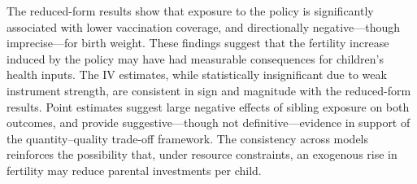 \documentclass[]{AEA}
\begin{document}
The reduced-form results show that exposure to the policy is
significantly associated with lower vaccination coverage, and
directionally negative---though imprecise---for birth weight. These
findings suggest that the fertility increase induced by the policy may
have had measurable consequences for children's health inputs. The IV
estimates, while statistically insignificant due to weak instrument
strength, are consistent in sign and magnitude with the reduced-form
results. Point estimates suggest large negative effects of sibling
exposure on both outcomes, and provide suggestive---though not
definitive---evidence in support of the quantity--quality trade-off
framework. The consistency across models reinforces the possibility
that, under resource constraints, an exogenous rise in fertility may
reduce parental investments per child.




\end{document}
